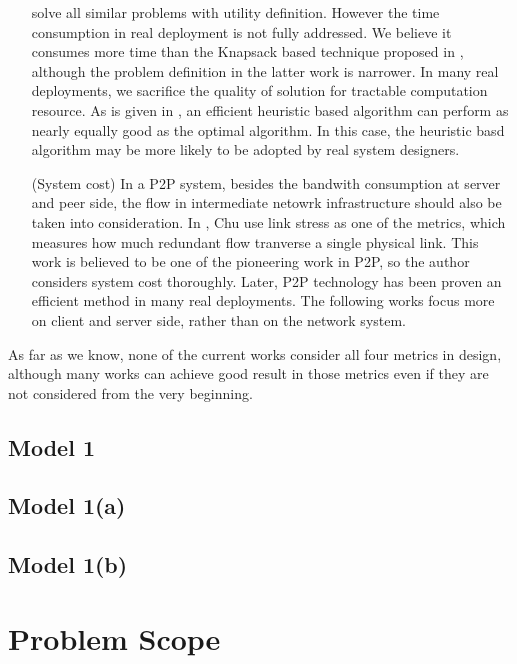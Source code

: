 \documentclass[11pt,a4paper]{article}
\begin{document}
\begin{itemize}
	solve all similar problems with utility definition. However the time consumption 
	in real deployment is not fully addressed. We believe it consumes 
	more time than the Knapsack based technique proposed in \cite{eberhard2010knapsack}, 
	although the problem definition in the latter work is narrower. In 
	many real deployments, we sacrifice the quality of solution for tractable 
	computation resource. As is given in \cite{eberhard2010knapsack}, an efficient 
	heuristic based algorithm can perform as nearly equally good as the optimal 
	algorithm. In this case, the heuristic basd algorithm may be more likely 
	to be adopted by real system designers. 
	\item [(System cost)] In a P2P system, besides the bandwith consumption at 
	server and peer side, the flow in intermediate netowrk infrastructure 
	should also be taken into consideration. In \cite{chu2001case}, Chu use
	link stress as one of the metrics, which measures how much redundant flow
	tranverse a single physical link. This work is believed to be one of the 
	pioneering work in P2P, so the author considers system cost thoroughly. 
	Later, P2P technology has been proven an efficient method in many real 
	deployments. The following works focus more on client and server side, rather
	than on the network system. 
\end{itemize}

As far as we know, none of the current works consider 
all four metrics in design, although many works can achieve 
good result in those metrics even if they are not considered 
from the very beginning. 

\subsection{Model 1}



\subsection{Model 1(a)}



\subsection{Model 1(b)}



\section{Problem Scope}
\label{sec:problem_scope}
\end{document}
